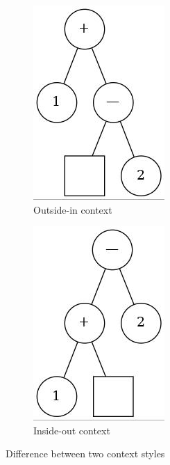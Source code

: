 \begin{figure}[h]
  \centering

  \begin{subfigure}{0.30\textwidth}
    \includegraphics[width=0.6\linewidth]{images/semantics/outside-in_context.jpg}
    \caption{Outside-in context}
  \end{subfigure}
  \hfill
  \begin{subfigure}{0.30\textwidth}
    \includegraphics[width=0.6\linewidth]{images/semantics/inside-out_context.jpg}
    \caption{Inside-out context}
  \end{subfigure}

  \caption{Difference between two context styles}
\end{figure}

